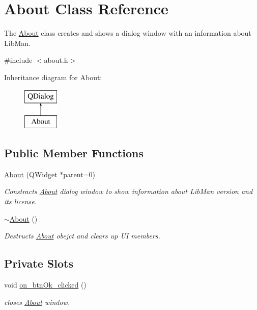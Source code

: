 \hypertarget{classAbout}{\section{About Class Reference}
\label{classAbout}
}


The \hyperlink{classAbout}{About} class creates and shows a dialog window with an information about Lib\-Man.  




{\ttfamily \#include $<$about.\-h$>$}

Inheritance diagram for About\-:\begin{figure}[H]
\begin{center}
\leavevmode
\includegraphics[height=2.000000cm]{classAbout}
\end{center}
\end{figure}
\subsection*{Public Member Functions}
\begin{DoxyCompactItemize}
\item 
\hyperlink{classAbout_ab79599ebbcdeffe0a96e00f010e64177}{About} (Q\-Widget $\ast$parent=0)
\begin{DoxyCompactList}\small\item\em Constracts \hyperlink{classAbout}{About} dialog window to show information about Lib\-Man version and its license. \end{DoxyCompactList}\item 
\hyperlink{classAbout_ace60197b1b610998908036ee1f802204}{$\sim$\-About} ()
\begin{DoxyCompactList}\small\item\em Destructs \hyperlink{classAbout}{About} obejct and clears up U\-I members. \end{DoxyCompactList}\end{DoxyCompactItemize}
\subsection*{Private Slots}
\begin{DoxyCompactItemize}
\item 
void \hyperlink{classAbout_aa6451b089d284c51ed3330eecf5a55db}{on\-\_\-btn\-Ok\-\_\-clicked} ()
\begin{DoxyCompactList}\small\item\em closes \hyperlink{classAbout}{About} window. \end{DoxyCompactList}\end{DoxyCompactItemize}

